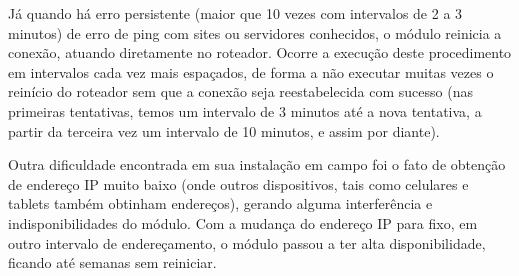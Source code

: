 Já quando há erro persistente (maior que 10 vezes com intervalos de 2 a 3 minutos) de erro de ping com sites ou servidores conhecidos, o módulo reinicia a conexão, atuando diretamente no roteador. Ocorre a execução deste procedimento em intervalos cada vez mais espaçados, de forma a não executar muitas vezes o reinício do roteador sem que a conexão seja reestabelecida com sucesso (nas primeiras tentativas, temos um intervalo de 3 minutos até a nova tentativa, a partir da terceira vez um intervalo de 10 minutos, e assim por diante).

Outra dificuldade encontrada em sua instalação em campo foi o fato de obtenção de endereço IP muito baixo (onde outros dispositivos, tais como celulares e tablets também obtinham endereços), gerando alguma interferência e indisponibilidades do módulo. Com a mudança do endereço IP para fixo, em outro intervalo de endereçamento, o módulo passou a ter alta disponibilidade, ficando até semanas sem reiniciar.
